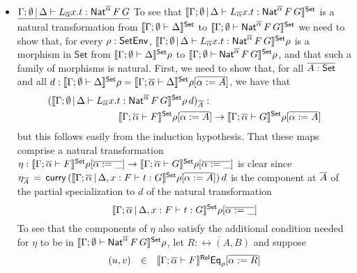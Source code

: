 \documentclass{lmcs}
\theoremstyle{plain}\newtheorem{satz}[thm]{Satz}
\newcommand{\set}{\mathsf{Set}}
\begin{document}
\begin{itemize}
\item $\underline{\Gamma; \emptyset \,|\, \Delta \vdash
  L_{\overline{\alpha}} x.t : \mathsf{Nat}^{\overline{\alpha}} \,F \,G}$ \; To
  see that $\setsem{\Gamma; \emptyset \,|\, \Delta \vdash
    L_{\overline{\alpha}} x.t : \Nat^{\overline{\alpha}} \,F \,G}$ is
  a natural transformation from $\setsem{\Gamma; \emptyset \vdash
    \Delta}$ to $\setsem{\Gamma; \emptyset \vdash
    \Nat^{\overline{\alpha}} \,F \,G}$ we need to show that, for every
  $\rho : \mathsf{SetEnv}$, $\setsem{\Gamma; \emptyset \,|\, \Delta \vdash
    L_{\overline{\alpha}} x.t : \Nat^{\overline{\alpha}} \,F \,G}\rho$
  is a morphism in $\set$ from $\setsem{\Gamma; \emptyset \vdash
    \Delta}\rho$ to $\setsem{\Gamma; \emptyset \vdash
    \Nat^{\overline{\alpha}} \,F \,G}\rho$, and that such a family of
  morphisms is natural.  First, we need to show that, for all $\ol{A :
    \set}$ and all $d : \setsem{\Gamma; \emptyset \vdash \Delta}\rho =
  \setsem{\Gamma; \ol{\alpha} \vdash \Delta}\rho[\overline{\alpha :=
      A}]$, we have that
  \begin{align*}
      &(\setsem{\Gamma; \emptyset \,|\, \Delta \vdash L_{\overline{\alpha}}
      x.t : \Nat^{\overline{\alpha}} \,F \,G}\rho\,d)_{\ol{A}} :  \\
      &\hspace{1in} \setsem{\Gamma; \ol{\alpha} \vdash F}\rho[\overline{\alpha := A}]
    \to \setsem{\Gamma; \ol{\alpha} \vdash G}\rho[\overline{\alpha :=
        A}]
  \end{align*}
      but this follows easily from the induction hypothesis.
That these maps comprise a natural transformation $\eta :
\setsem{\Gamma; \ol{\alpha} \vdash F}\rho[\overline{\alpha := \_}] \to
\setsem{\Gamma; \ol{\alpha} \vdash G}\rho[\overline{\alpha := \_}]$ is
clear since $\eta_{\ol{A}} \, = \, \curry\,
(\setsem{\Gamma; \overline{\alpha} \,|\, \Delta, x : F \vdash t:
  G}\rho[\overline{\alpha := A}])\,d$ is the component at $\overline{A}$ of
the partial specialization to $d$ of the natural transformation
$$\setsem{\Gamma; \overline{\alpha} \,|\, \Delta, x : F \vdash t:
  G}\rho[\overline{\alpha := \_}]$$  To see that the components of
$\eta$ also satisfy the additional condition needed for $\eta$ to
be in $\setsem{\Gamma; \emptyset \vdash \Nat^{\overline{\alpha}} \,F
  \,G}\rho$, let $\overline{R : \rel(A, B)}$ and suppose
\[\begin{array}{lll}
(u, v) &  \in & \llbracket{\Gamma;\overline{\alpha} \vdash F}\rrbracket^{\mathsf{Rel}}
\mathsf{Eq}_{\rho}[\overline{\alpha := R}]\\

\end{array}\]
\end{itemize}
\end{document}
